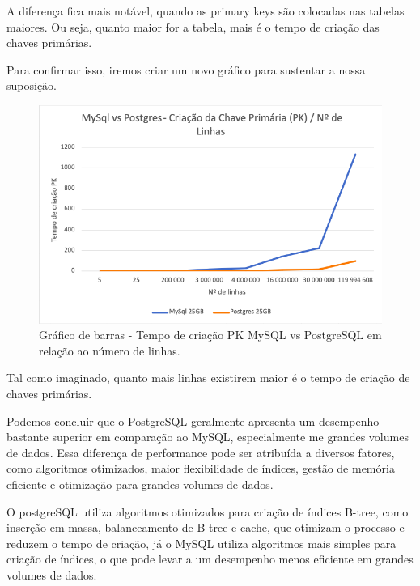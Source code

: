 \documentclass{article}
\begin{document}
A diferença fica mais notável, quando as primary keys são colocadas nas tabelas maiores. Ou seja, quanto maior for a tabela, mais é o tempo de criação das chaves primárias.

Para confirmar isso, iremos criar um novo gráfico para sustentar a nossa suposição.

\begin{figure}[H]
  \centering
  \includegraphics[width=\textwidth]{Graphs/linesvspk.png}
  \caption{Gráfico de barras - Tempo de criação PK MySQL vs PostgreSQL em relação ao número de linhas.}
  \label{fig:PKCreation2}
\end{figure}

\texttt{}\par Tal como imaginado, quanto mais linhas existirem maior é o tempo de criação de chaves primárias. \\
\texttt{}\par Podemos concluir que o PostgreSQL geralmente apresenta um desempenho bastante superior em comparação ao MySQL, especialmente me grandes volumes de dados. Essa diferença de performance pode ser atribuída a diversos fatores, como algoritmos otimizados, maior flexibilidade de índices, gestão de memória eficiente e otimização para grandes volumes de dados.\\

\texttt{}\par O postgreSQL utiliza algoritmos otimizados para criação de índices B-tree, como inserção em massa, balanceamento de B-tree e cache, que otimizam o processo e reduzem o tempo de criação, já o MySQL utiliza algoritmos mais simples para criação de índices, o que pode levar a um desempenho menos eficiente em grandes volumes de dados.\\
\end{document}
